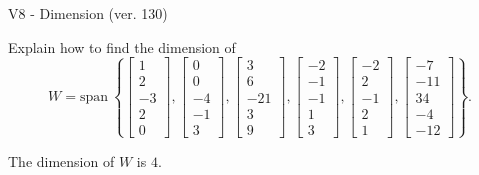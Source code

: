\begin{exercise}
  \begin{exerciseTitle}V8 - Dimension (ver. 130)\end{exerciseTitle}
  \begin{exerciseStatement}
    Explain how to find the dimension of 
\[W=\mathrm{span}\ \left\{\left[\begin{array}{r}
1 \\
2 \\
-3 \\
2 \\
0
\end{array}\right] , \left[\begin{array}{r}
0 \\
0 \\
-4 \\
-1 \\
3
\end{array}\right] , \left[\begin{array}{r}
3 \\
6 \\
-21 \\
3 \\
9
\end{array}\right] , \left[\begin{array}{r}
-2 \\
-1 \\
-1 \\
1 \\
3
\end{array}\right] , \left[\begin{array}{r}
-2 \\
2 \\
-1 \\
2 \\
1
\end{array}\right] , \left[\begin{array}{r}
-7 \\
-11 \\
34 \\
-4 \\
-12
\end{array}\right]\right\}.\]



  \end{exerciseStatement}
  \begin{exerciseAnswer}
   The dimension of \(W\) is  \(4\).
  


  \end{exerciseAnswer}
\end{exercise}
